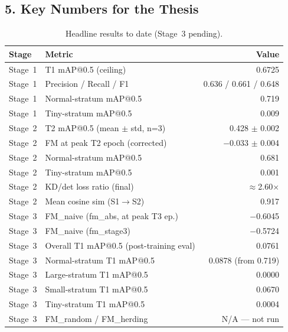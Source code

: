 \subsection*{5. Key Numbers for the Thesis}

\begin{table}[h]
\centering
\caption{Headline results to date (Stage~3 pending).}
\label{tab:headline}
\small
\begin{tabular}{llr}
\hline
\textbf{Stage} & \textbf{Metric} & \textbf{Value} \\
\hline
Stage~1 & T1 mAP@0.5 (ceiling)              & 0.6725 \\
Stage~1 & Precision / Recall / F1            & 0.636 / 0.661 / 0.648 \\
Stage~1 & Normal-stratum mAP@0.5             & 0.719 \\
Stage~1 & Tiny-stratum mAP@0.5              & 0.009 \\
\hline
Stage~2 & T2 mAP@0.5 (mean $\pm$ std, n=3)  & 0.428 $\pm$ 0.002 \\
Stage~2 & FM at peak T2 epoch (corrected)    & $-$0.033 $\pm$ 0.004 \\
Stage~2 & Normal-stratum mAP@0.5             & 0.681 \\
Stage~2 & Tiny-stratum mAP@0.5              & 0.001 \\
Stage~2 & KD/det loss ratio (final)          & $\approx$2.60$\times$ \\
Stage~2 & Mean cosine sim (S1$\to$S2)        & 0.917 \\
\hline
Stage~3 & FM\_naive (fm\_abs, at peak T3 ep.) & $-$0.6045 \\
Stage~3 & FM\_naive (fm\_stage3)             & $-$0.5724 \\
Stage~3 & Overall T1 mAP@0.5 (post-training eval) & 0.0761 \\
Stage~3 & Normal-stratum T1 mAP@0.5         & 0.0878 (from 0.719) \\
Stage~3 & Large-stratum T1 mAP@0.5          & 0.0000 \\
Stage~3 & Small-stratum T1 mAP@0.5          & 0.0670 \\
Stage~3 & Tiny-stratum T1 mAP@0.5           & 0.0004 \\
Stage~3 & FM\_random / FM\_herding           & N/A — not run \\
\hline
\end{tabular}
\end{table}

